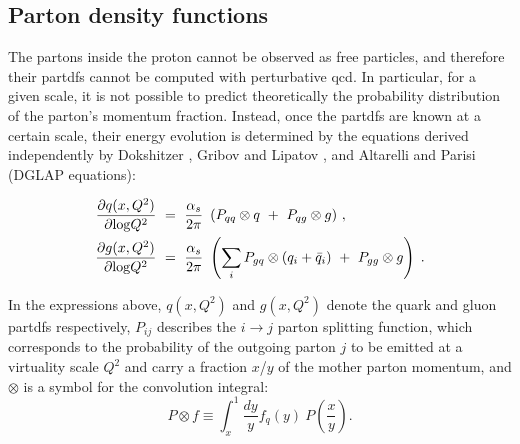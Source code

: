 


\subsection{Parton density functions}
\label{sec:protpdf}

The partons inside the proton cannot be observed as free particles, and therefore their \glspl{partdf} cannot be computed with
perturbative \gls{qcd}. In particular, for a given scale, it is not possible to predict theoretically the probability distribution 
of the parton's momentum fraction. Instead, once the \glspl{partdf} are known at a certain scale, their energy evolution is 
determined by the equations derived independently by Dokshitzer \cite{Dokshitzer:1977sg} , Gribov and Lipatov \cite{Gribov:1972ri}, and Altarelli and Parisi \cite{ALTARELLI1977298} (DGLAP equations):

\begin{equation}
\begin{aligned}
\frac{\partial q(x,Q^2)}{\partial {\rm log}Q^2}~&=~\frac{\alpha_s}{2\pi}~\left( P_{qq} \otimes q~+~P_{qg} \otimes g \right) \, ,\\
\frac{\partial g(x,Q^2)}{\partial {\rm log}Q^2}~&=~\frac{\alpha_s}{2\pi}~\left( \sum_i P_{gq} \otimes (q_i+\bar{q}_i)~+~P_{gg} \otimes g \right) \; .
\label{eq:glap1}
\end{aligned}
\end{equation}

\noindent In the expressions above, $q(x,Q^2)$ and $g(x,Q^2)$ denote the quark and gluon \glspl{partdf} respectively, 
$P_{ij}$ describes the $i \to j$ parton splitting function, 
which corresponds to the probability of the outgoing parton $j$ 
to be emitted at a virtuality scale $Q^2$ and carry a fraction $x$/$y$ of the mother parton momentum, 
and $\otimes$ is a symbol for the convolution integral:
\begin{equation}
P \otimes f \equiv \int^1_x\frac{dy}{y}f_q(y)~P\left(\frac{x}{y}\right).
\end{equation}

